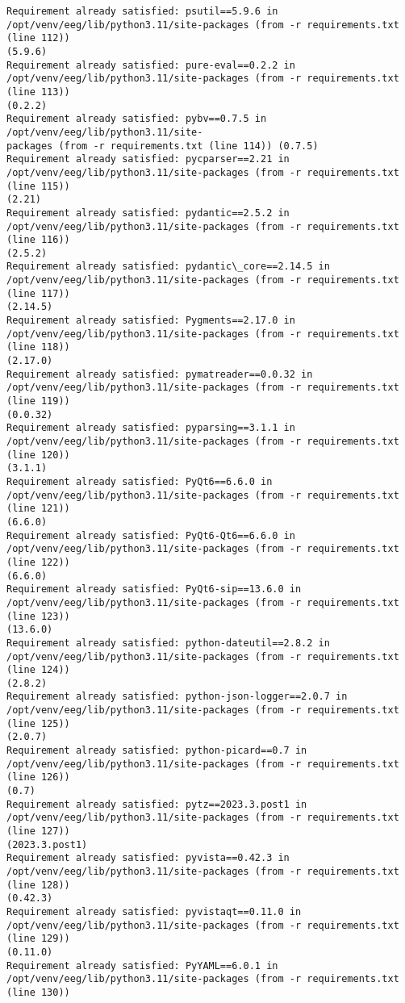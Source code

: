 \documentclass[11pt]{article}
\begin{document}
\begin{Verbatim}[commandchars=\\\{\}]
Requirement already satisfied: psutil==5.9.6 in
/opt/venv/eeg/lib/python3.11/site-packages (from -r requirements.txt (line 112))
(5.9.6)
Requirement already satisfied: pure-eval==0.2.2 in
/opt/venv/eeg/lib/python3.11/site-packages (from -r requirements.txt (line 113))
(0.2.2)
Requirement already satisfied: pybv==0.7.5 in /opt/venv/eeg/lib/python3.11/site-
packages (from -r requirements.txt (line 114)) (0.7.5)
Requirement already satisfied: pycparser==2.21 in
/opt/venv/eeg/lib/python3.11/site-packages (from -r requirements.txt (line 115))
(2.21)
Requirement already satisfied: pydantic==2.5.2 in
/opt/venv/eeg/lib/python3.11/site-packages (from -r requirements.txt (line 116))
(2.5.2)
Requirement already satisfied: pydantic\_core==2.14.5 in
/opt/venv/eeg/lib/python3.11/site-packages (from -r requirements.txt (line 117))
(2.14.5)
Requirement already satisfied: Pygments==2.17.0 in
/opt/venv/eeg/lib/python3.11/site-packages (from -r requirements.txt (line 118))
(2.17.0)
Requirement already satisfied: pymatreader==0.0.32 in
/opt/venv/eeg/lib/python3.11/site-packages (from -r requirements.txt (line 119))
(0.0.32)
Requirement already satisfied: pyparsing==3.1.1 in
/opt/venv/eeg/lib/python3.11/site-packages (from -r requirements.txt (line 120))
(3.1.1)
Requirement already satisfied: PyQt6==6.6.0 in
/opt/venv/eeg/lib/python3.11/site-packages (from -r requirements.txt (line 121))
(6.6.0)
Requirement already satisfied: PyQt6-Qt6==6.6.0 in
/opt/venv/eeg/lib/python3.11/site-packages (from -r requirements.txt (line 122))
(6.6.0)
Requirement already satisfied: PyQt6-sip==13.6.0 in
/opt/venv/eeg/lib/python3.11/site-packages (from -r requirements.txt (line 123))
(13.6.0)
Requirement already satisfied: python-dateutil==2.8.2 in
/opt/venv/eeg/lib/python3.11/site-packages (from -r requirements.txt (line 124))
(2.8.2)
Requirement already satisfied: python-json-logger==2.0.7 in
/opt/venv/eeg/lib/python3.11/site-packages (from -r requirements.txt (line 125))
(2.0.7)
Requirement already satisfied: python-picard==0.7 in
/opt/venv/eeg/lib/python3.11/site-packages (from -r requirements.txt (line 126))
(0.7)
Requirement already satisfied: pytz==2023.3.post1 in
/opt/venv/eeg/lib/python3.11/site-packages (from -r requirements.txt (line 127))
(2023.3.post1)
Requirement already satisfied: pyvista==0.42.3 in
/opt/venv/eeg/lib/python3.11/site-packages (from -r requirements.txt (line 128))
(0.42.3)
Requirement already satisfied: pyvistaqt==0.11.0 in
/opt/venv/eeg/lib/python3.11/site-packages (from -r requirements.txt (line 129))
(0.11.0)
Requirement already satisfied: PyYAML==6.0.1 in
/opt/venv/eeg/lib/python3.11/site-packages (from -r requirements.txt (line 130))

\end{Verbatim}
\end{document}
